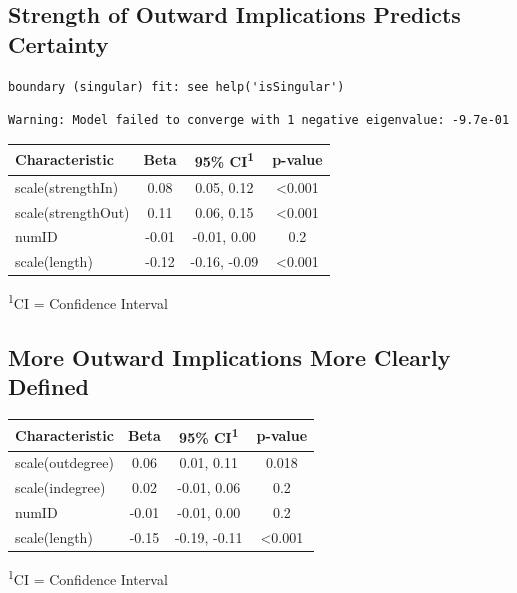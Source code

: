 \documentclass[
  .7em,
  letterpaper,
  DIV=11,
  numbers=noendperiod]{scrartcl}
\begin{document}
\hypertarget{strength-of-outward-implications-predicts-certainty}{%
\subsection{Strength of Outward Implications Predicts
Certainty}\label{strength-of-outward-implications-predicts-certainty}}

\begin{verbatim}
boundary (singular) fit: see help('isSingular')
\end{verbatim}

\begin{verbatim}
Warning: Model failed to converge with 1 negative eigenvalue: -9.7e-01
\end{verbatim}

\captionsetup[table]{labelformat=empty,skip=1pt}
\setlength{\LTpost}{0mm}
\begin{longtable}{lccc}
\toprule
\textbf{Characteristic} & \textbf{Beta} & \textbf{95\% CI}\textsuperscript{1} & \textbf{p-value} \\ 
\midrule
scale(strengthIn) & 0.08 & 0.05, 0.12 & <0.001 \\ 
scale(strengthOut) & 0.11 & 0.06, 0.15 & <0.001 \\ 
numID & -0.01 & -0.01, 0.00 & 0.2 \\ 
scale(length) & -0.12 & -0.16, -0.09 & <0.001 \\ 
\bottomrule
\end{longtable}
\begin{minipage}{\linewidth}
\textsuperscript{1}CI = Confidence Interval\\
\end{minipage}

\hypertarget{more-outward-implications-more-clearly-defined}{%
\subsection{More Outward Implications More Clearly
Defined}\label{more-outward-implications-more-clearly-defined}}

\captionsetup[table]{labelformat=empty,skip=1pt}
\setlength{\LTpost}{0mm}
\begin{longtable}{lccc}
\toprule
\textbf{Characteristic} & \textbf{Beta} & \textbf{95\% CI}\textsuperscript{1} & \textbf{p-value} \\ 
\midrule
scale(outdegree) & 0.06 & 0.01, 0.11 & 0.018 \\ 
scale(indegree) & 0.02 & -0.01, 0.06 & 0.2 \\ 
numID & -0.01 & -0.01, 0.00 & 0.2 \\ 
scale(length) & -0.15 & -0.19, -0.11 & <0.001 \\ 
\bottomrule
\end{longtable}
\begin{minipage}{\linewidth}
\textsuperscript{1}CI = Confidence Interval\\
\end{minipage}
\end{document}
